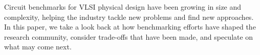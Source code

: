 Circuit benchmarks for VLSI physical design
have been growing in size and complexity, helping
the industry tackle new problems and find new
approaches.  In this paper, we take a look back
at how benchmarking efforts have shaped the
research community, consider trade-offs that
have been made, and speculate on what may come
next.

